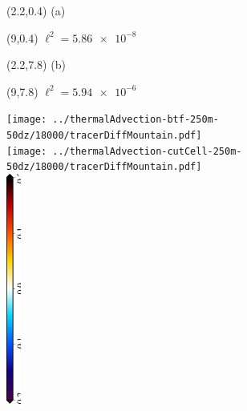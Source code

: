 \documentclass{article}
\begin{document}
\TPMargin{3pt}
\begin{textblock}{0.75}(2.2,0.4)
\normalsize
\centering
(a)
\end{textblock}
\begin{textblock}{2}(9,0.4)
\normalsize
$\ell^2 = \num{5.86e-8}$
\end{textblock}
\begin{textblock}{0.75}(2.2,7.8)
\normalsize
\centering
(b)
\end{textblock}
\begin{textblock}{2}(9,7.8)
\normalsize
$\ell^2 = \num{5.94e-6}$
\end{textblock}
\centering
\texttt{[image: ../thermalAdvection-btf-250m-50dz/18000/tracerDiffMountain.pdf]} \\
\vspace*{0.1in}
\texttt{[image: ../thermalAdvection-cutCell-250m-50dz/18000/tracerDiffMountain.pdf]} \\
\includegraphics[height=3in,angle=270]{tracerDiffMountain_T_diff.eps}
\end{document}
